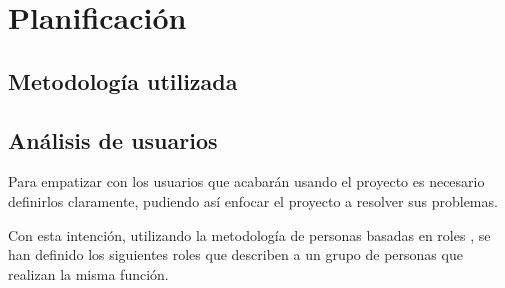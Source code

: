 \chapter{Planificación}

\section{Metodología utilizada}

\section{Análisis de usuarios}

Para empatizar con los usuarios que acabarán usando el proyecto es necesario definirlos claramente, pudiendo así enfocar el proyecto a resolver sus problemas.

Con esta intención, utilizando la metodología de personas basadas en roles \cite{role-personas}, se han definido los siguientes roles que describen a un grupo de personas que realizan la misma función.

